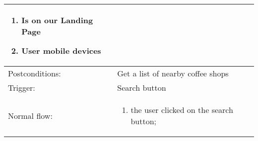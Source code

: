 \begin{longtable}{| p{3.5cm} | p{9cm} |}
\begin{enumerate}
\item Is on our Landing Page
\item User mobile devices 
\end{enumerate}\\
\hline
Postconditions: & Get a list of nearby coffee shops\\
\hline
Trigger: &  Search button\\
\hline
Normal flow: &\mbox{}\par\vspace{-\baselineskip}
\begin{enumerate}
\item the user clicked on the search button;
\end{enumerate}\\
\hline
\end{longtable}

